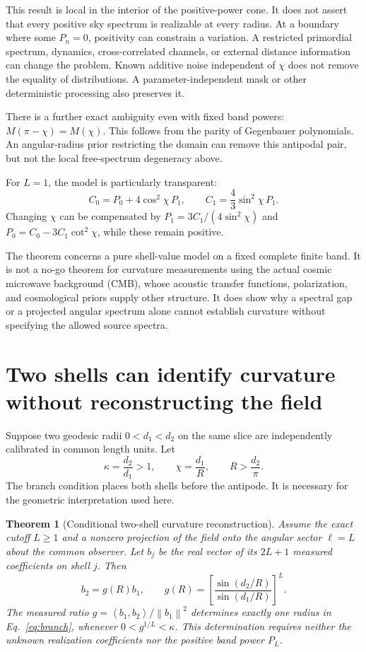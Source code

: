 \documentclass[aps,prd,reprint,amsmath,amssymb,nofootinbib,
longbibliography]{revtex4-2}
\newtheorem{theorem}{Theorem}
\newcommand{\norm}[1]{\left\lVert#1\right\rVert}
\newcommand{\ip}[2]{\left\langle#1,#2\right\rangle}
\begin{document}
This result is local in the interior of the positive-power cone. It does
not assert that every positive sky spectrum is realizable at every radius.
At a boundary where some $P_n=0$, positivity can constrain a variation.
A restricted primordial spectrum, dynamics, cross-correlated channels,
or external distance information can change the problem. Known additive
noise independent of $\chi$ does not remove the equality of distributions.
A parameter-independent mask or other deterministic processing also
preserves it.

There is a further exact ambiguity even with fixed band powers:
$M(\pi-\chi)=M(\chi)$. This follows from the parity of Gegenbauer
polynomials. An angular-radius prior restricting the domain can remove
this antipodal pair, but not the local free-spectrum degeneracy above.

For $L=1$, the model is particularly transparent:
\begin{equation}
 C_0=P_0+4\cos^2\chi\,P_1,
 \qquad C_1=\frac43\sin^2\chi\,P_1.
\end{equation}
Changing $\chi$ can be compensated by
$P_1=3C_1/(4\sin^2\chi)$ and
$P_0=C_0-3C_1\cot^2\chi$, while these remain positive.

The theorem concerns a pure shell-value model on a fixed complete finite
band. It is not a no-go theorem for curvature measurements using the
actual cosmic microwave background (CMB), whose acoustic transfer
functions, polarization, and cosmological priors supply other structure.
It does show why a spectral gap or a projected angular spectrum alone
cannot establish curvature without specifying the allowed source spectra.

\section{Two shells can identify curvature without reconstructing the field}
\label{sec:twoshell}

Suppose two geodesic radii $0<d_1<d_2$ on the same slice are independently
calibrated in common length units. Let
\begin{equation}
 \kappa=\frac{d_2}{d_1}>1,\qquad
 \chi=\frac{d_1}{R},\qquad R>\frac{d_2}{\pi}.
 \label{eq:branch}
\end{equation}
The branch condition places both shells before the antipode. It is
necessary for the geometric interpretation used here.

\begin{theorem}[Conditional two-shell curvature reconstruction]
\label{thm:radius}
Assume the exact cutoff $L\geq1$ and a nonzero projection of the field
onto the angular sector $\ell=L$ about the common observer. Let $b_j$
be the real vector of its $2L+1$ measured coefficients on shell $j$.
Then
\begin{equation}
 b_2=g(R)b_1,\qquad
 g(R)=\left[\frac{\sin(d_2/R)}{\sin(d_1/R)}\right]^L.
 \label{eq:ratio}
\end{equation}
The measured ratio
$g=\ip{b_1}{b_2}/\norm{b_1}^2$ determines exactly one radius in
Eq.~\eqref{eq:branch}, whenever $0<g^{1/L}<\kappa$.
This determination requires neither the unknown realization coefficients
nor the positive band power $P_L$.
\end{theorem}
\end{document}
